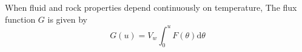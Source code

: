 %
%
%    
%
%
%
%    
%
%
%
%
When fluid and rock properties depend continuously on temperature, The flux function $G$ is given by 
\begin{equation}
G(u) = V_{w}\int_{0}^{u} F(\theta)\mathrm{d}\theta\nonumber
\end{equation}

